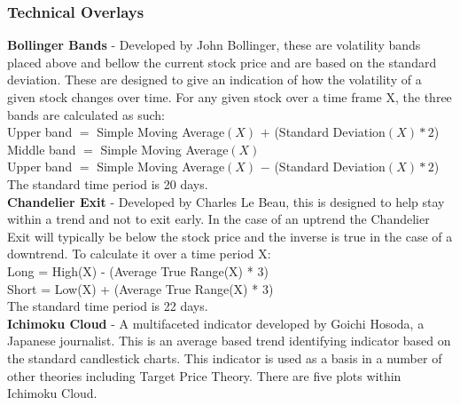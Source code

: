 \documentclass[12pt,a4paper]{article}
\begin{document}
\iffalse
#################################################################################
\fi

\subsubsection*{Technical Overlays}

\textbf{Bollinger Bands}  - Developed by John Bollinger, these are volatility bands placed above and bellow the current stock price and are based on the standard deviation. These are designed to give an indication of how the volatility of a given stock changes over time. For any given stock over a time frame X, the three bands are calculated as such:\\

\noindent
Upper band $=$ Simple Moving Average$(X)$ $+$ (Standard Deviation$(X) * 2$)\\
Middle band $=$ Simple Moving Average$(X)$\\
Upper band $=$ Simple Moving Average$(X)$ $-$ (Standard Deviation$(X) * 2$)\\

\noindent
The standard time period is 20 days.\\

\iffalse
[Visual knowledge discovery and machine learning for investment strategy]
[Bollinger on bollinger bands]
\fi

\noindent
\textbf{Chandelier Exit} - Developed by Charles Le Beau, this is designed to help stay within a trend and not to exit early. In the case of an uptrend the Chandelier Exit will typically be below the stock price and the inverse is true in the case of a downtrend. To calculate it over a time period X:\\

\noindent
Long = High(X) - (Average True Range(X) * 3)\\
Short = Low(X) + (Average True Range(X) * 3)\\

\noindent
The standard time period is 22 days.\\

\iffalse
[]
\fi

\noindent
\textbf{Ichimoku Cloud} - A multifaceted indicator developed by Goichi Hosoda, a Japanese journalist. This is an average based trend identifying indicator based on the standard candlestick charts. This indicator is used as a basis in a number of other theories including Target Price Theory. There are five plots within Ichimoku Cloud.\\
\end{document}
